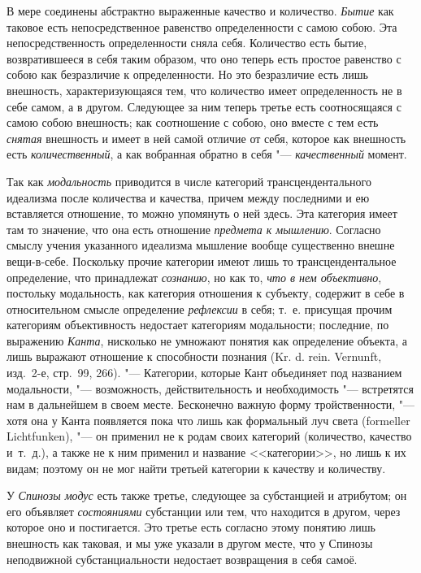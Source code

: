 В мере соединены абстрактно выраженные качество
и количество. {\em Бытие} как таковое есть
непосредственное равенство определенности с самою собою. Эта
непосредственность определенности сняла себя. Количество есть бытие,
возвратившееся в себя таким образом, что оно теперь есть простое равенство
с собою как безразличие к определенности. Но это безразличие есть лишь
внешность, характеризующаяся тем, что количество имеет определенность не в
себе самом, а в другом. Следующее за ним теперь третье есть соотносящаяся с
самою собою внешность; как соотношение с собою, оно вместе с тем есть
{\em снятая} внешность и имеет в ней самой отличие от
себя, которое как внешность есть {\em количественный},
а как вобранная обратно в себя "--- {\em качественный} момент.

Так как {\em модальность} приводится в числе категорий
трансцендентального идеализма после количества и качества, причем между
последними и ею вставляется отношение, то можно упомянуть о ней здесь. Эта
категория имеет там то значение, что она есть отношение
{\em предмета к мышлению}. Согласно смыслу учения
указанного идеализма мышление вообще существенно внешне вещи-в-себе.
Поскольку прочие категории имеют лишь то трансцендентальное определение,
что принадлежат {\em сознанию}, но как то,
{\em что в нем объективно}, постольку модальность, как
категория отношения к субъекту, содержит в себе в относительном смысле
определение {\em рефлексии} в себя; т.~е. присущая
прочим категориям объективность недостает категориям модальности;
последние, по выражению {\em Канта}, нисколько не
умножают понятия как определение объекта, а лишь выражают отношение к
способности познания (Kr. d. rein. Vernunft, изд.~2-е, стр.~99, 266). "---
Категории, которые Кант объединяет под названием модальности, "---
возможность, действительность и необходимость "--- встретятся нам в дальнейшем
в своем месте. Бесконечно важную форму тройственности, "--- хотя она у Канта
появляется пока что лишь как формальный луч света (formeller Lichtfunken),
"--- он применил не к родам своих категорий (количество, качество и~т.~д.), а
также не к ним применил и название <<категории>>, но лишь к их видам; поэтому
он не мог найти третьей категории к качеству и количеству.

У {\em Спинозы модус} есть
также третье, следующее за субстанцией и атрибутом; он его объявляет
{\em состояниями} субстанции или тем, что находится в
другом, через которое оно и постигается. Это третье есть согласно этому
понятию лишь внешность как таковая, и мы уже указали в другом месте, что у
Спинозы неподвижной субстанциальности недостает возвращения в себя самоё.


